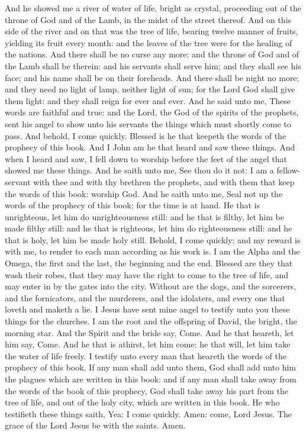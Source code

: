 And he showed me a river of water of life, bright as crystal, proceeding out of the throne of God and of the Lamb, in the midst of the street thereof. And on this side of the river and on that was the tree of life, bearing twelve manner of fruits, yielding its fruit every month: and the leaves of the tree were for the healing of the nations. And there shall be no curse any more: and the throne of God and of the Lamb shall be therein: and his servants shall serve him; and they shall see his face; and his name shall be on their foreheads. And there shall be night no more; and they need no light of lamp, neither light of sun; for the Lord God shall give them light: and they shall reign for ever and ever.  And he said unto me, These words are faithful and true: and the Lord, the God of the spirits of the prophets, sent his angel to show unto his servants the things which must shortly come to pass. And behold, I come quickly. Blessed is he that keepeth the words of the prophecy of this book.  And I John am he that heard and saw these things. And when I heard and saw, I fell down to worship before the feet of the angel that showed me these things. And he saith unto me, See thou do it not: I am a fellow-servant with thee and with thy brethren the prophets, and with them that keep the words of this book: worship God.  And he saith unto me, Seal not up the words of the prophecy of this book; for the time is at hand. He that is unrighteous, let him do unrighteousness still: and he that is filthy, let him be made filthy still: and he that is righteous, let him do righteousness still: and he that is holy, let him be made holy still. Behold, I come quickly; and my reward is with me, to render to each man according as his work is. I am the Alpha and the Omega, the first and the last, the beginning and the end. Blessed are they that wash their robes, that they may have the right to come to the tree of life, and may enter in by the gates into the city. Without are the dogs, and the sorcerers, and the fornicators, and the murderers, and the idolaters, and every one that loveth and maketh a lie.  I Jesus have sent mine angel to testify unto you these things for the churches. I am the root and the offspring of David, the bright, the morning star.  And the Spirit and the bride say, Come. And he that heareth, let him say, Come. And he that is athirst, let him come: he that will, let him take the water of life freely.  I testify unto every man that heareth the words of the prophecy of this book, If any man shall add unto them, God shall add unto him the plagues which are written in this book: and if any man shall take away from the words of the book of this prophecy, God shall take away his part from the tree of life, and out of the holy city, which are written in this book.  He who testifieth these things saith, Yea: I come quickly. Amen: come, Lord Jesus.  The grace of the Lord Jesus be with the saints. Amen. 